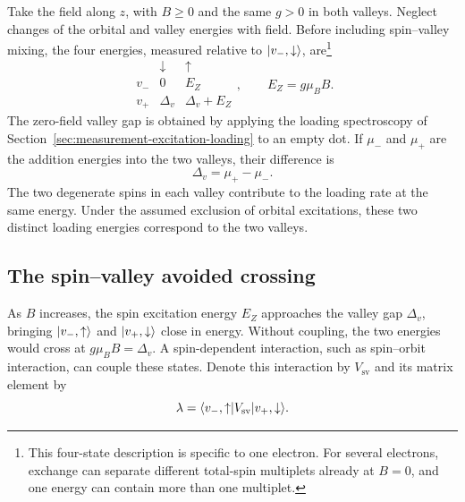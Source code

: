 Take the field along $z$, with $B\geq0$ and the same
$g>0$ in both valleys. Neglect changes of the orbital and valley
energies with field. Before including spin--valley mixing, the
four energies, measured relative to $\lvert v_-,\downarrow\rangle$,
are\footnote{This four-state description is specific to one
electron. For several electrons, exchange can separate different
total-spin multiplets already at $B=0$, and one energy can contain
more than one multiplet.}
\begin{equation}
 \begin{array}{c|cc}
  &\downarrow&\uparrow\\ \hline
  v_-&0&E_Z\\
  v_+&\Delta_v&\Delta_v+E_Z
 \end{array},
 \qquad E_Z=g\mu_BB.
 \label{eq:measurement-spin-valley-levels}
\end{equation}
The zero-field valley gap is obtained by applying the loading
spectroscopy of Section~\ref{sec:measurement-excitation-loading} to
an empty dot. If $\mu_-$ and $\mu_+$ are the addition energies
into the two valleys, their difference is
\begin{equation}
 \Delta_v=\mu_+-\mu_-.
 \label{eq:measurement-valley-addition-gap}
\end{equation}
The two degenerate spins in each valley contribute to the loading
rate at the same energy. Under the assumed exclusion of orbital
excitations, these two distinct loading energies correspond to
the two valleys.

\subsection{The spin--valley avoided crossing}
As $B$ increases, the spin excitation energy $E_Z$ approaches
the valley gap $\Delta_v$, bringing $\lvert v_-,\uparrow\rangle$ and
$\lvert v_+,\downarrow\rangle$ close in energy. Without coupling, the two energies
would cross at $g\mu_BB=\Delta_v$. A spin-dependent interaction,
such as spin--orbit interaction, can couple these states.
Denote this interaction by $V_{\mathrm{sv}}$ and its matrix
element by
\[
 \lambda=\langle v_-,\uparrow\rvert V_{\mathrm{sv}}\lvert v_+,\downarrow\rangle.
\]

